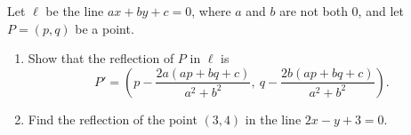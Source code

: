 Let $\ell$ be the line $ax+by+c=0$, where $a$ and $b$ are not both $0$, and let $P=(p,q)$ be a point.
\begin{enumerate}
\item[(a)] Show that the reflection of $P$ in $\ell$ is
\[
P'=\left(p-\dfrac{2a(ap+bq+c)}{a^2+b^2},\ q-\dfrac{2b(ap+bq+c)}{a^2+b^2}\right).
\]
\item[(b)] Find the reflection of the point $(3,4)$ in the line $2x-y+3=0$.
\end{enumerate}
